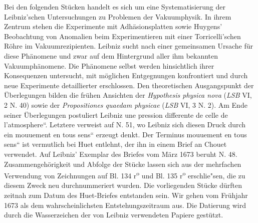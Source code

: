 Bei den folgenden St\"{u}cken handelt es sich um eine Systematisierung der Leibniz'schen Untersuchungen zu Problemen der Vakuumphysik. In ihrem Zentrum stehen die Experimente mit Adh\"{a}sionsplatten sowie Huygens' Beobachtung von Anomalien beim Experimentieren mit einer Torricelli'schen R\"{o}hre im Vakuumrezipienten. Leibniz sucht nach einer gemeinsamen Ursache f\"{u}r diese Ph\"{a}nomene und zwar auf dem Hintergrund aller ihm bekannten Vakuumph\"{a}nomene. Die Ph\"{a}nomene selbst werden hinsichtlich ihrer Konsequenzen untersucht, mit m\"{o}glichen Entgegnungen konfrontiert und durch neue Experimente detaillierter erschlossen. Den theoretischen Ausgangspunkt der \"{U}berlegungen bilden die fr\"{u}hen Ansichten der \textit{Hypothesis physica nova} (\cite{00256}\textit{LSB} VI, 2 N. 40) sowie der \cite{00257}\textit{Propositiones quaedam physicae} (\textit{LSB} VI, 3 N. 2). Am Ende seiner Überlegungen postuliert Leibniz \glqq une pression differente de celle de l'atmosphere``. Letztere verweist auf N. 51, wo Leibniz sich diesen Druck durch ein \glqq mouuement en tous sens`` erzeugt denkt. Der Terminus \glqq mouuement en tous sens`` ist vermutlich bei Huet\protect{} entlehnt, der ihn in einem Brief an Chouet\protect{} verwendet. Auf Leibniz' Exemplar des Briefes vom M\"{a}rz 1673 beruht \cite{00267}N. 48. Zusammengeh\"{o}rigkeit und Abfolge der St\"{u}cke lassen sich aus der mehrfachen Verwendung von Zeichnungen auf Bl. 134 r\textsuperscript{o} und Bl. 135 r\textsuperscript{o} erschlie"sen, die zu diesem Zweck neu durchnummeriert wurden. Die vorliegenden St\"{u}cke d\"{u}rften zeitnah zum Datum des Huet-Briefes entstanden sein. Wir gehen vom Fr\"{u}hjahr 1673 als dem wahrscheinlichsten Entstehungszeitraum aus. Die Datierung wird durch die Wasserzeichen der von Leibniz verwendeten Papiere gest\"{u}tzt.